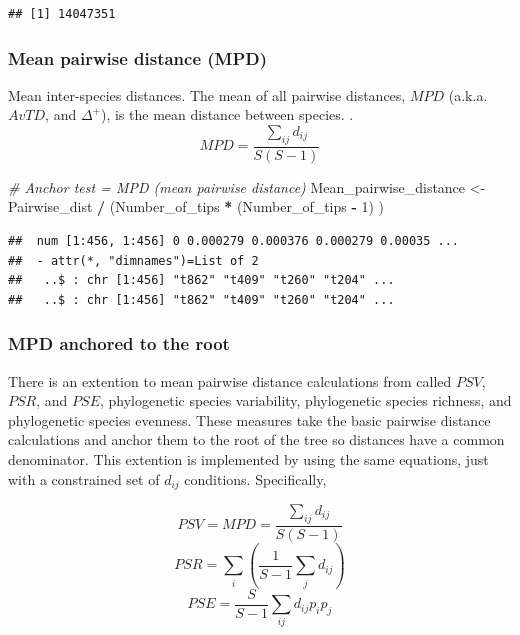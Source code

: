 \documentclass[]{book}
\newenvironment{Shaded}{\begin{snugshade}}{\end{snugshade}}
\newcommand{\DecValTok}[1]{\textcolor[rgb]{0.00,0.00,0.81}{{#1}}}
\newcommand{\StringTok}[1]{\textcolor[rgb]{0.31,0.60,0.02}{{#1}}}
\newcommand{\CommentTok}[1]{\textcolor[rgb]{0.56,0.35,0.01}{\textit{{#1}}}}
\newcommand{\OperatorTok}[1]{\textcolor[rgb]{0.81,0.36,0.00}{\textbf{{#1}}}}
\newcommand{\NormalTok}[1]{{#1}}
\theoremstyle{definition}
\theoremstyle{definition}
\theoremstyle{definition}
\theoremstyle{remark}
\begin{document}
\begin{verbatim}
## [1] 14047351
\end{verbatim}

\subsubsection{Mean pairwise distance
(MPD)}\label{mean-pairwise-distance-mpd}

Mean inter-species distances. The mean of all pairwise distances,
\(MPD\) (a.k.a. \(AvTD\), and \(\Delta^{+}\)), is the mean distance
between species. \citep{Clarke1998, Webb2002, Webb2008, Kembel2010}.
\[MPD = \dfrac{\sum_{ij} d_{ij}}{S(S-1)}\]

\begin{Shaded}
\begin{Highlighting}[]
\CommentTok{# Anchor test = MPD (mean pairwise distance)}
\NormalTok{Mean_pairwise_distance <-}\StringTok{ }
\StringTok{  }\NormalTok{Pairwise_dist }\OperatorTok{/}\StringTok{ }\NormalTok{(Number_of_tips }\OperatorTok{*}\StringTok{ }\NormalTok{(Number_of_tips }\OperatorTok{-}\StringTok{ }\DecValTok{1}\NormalTok{) ) }
\end{Highlighting}
\end{Shaded}

\begin{verbatim}
##  num [1:456, 1:456] 0 0.000279 0.000376 0.000279 0.00035 ...
##  - attr(*, "dimnames")=List of 2
##   ..$ : chr [1:456] "t862" "t409" "t260" "t204" ...
##   ..$ : chr [1:456] "t862" "t409" "t260" "t204" ...
\end{verbatim}

\subsubsection{MPD anchored to the root}\label{mpd-anchored-to-the-root}

There is an extention to mean pairwise distance calculations from
\citet{Helmus2010} called \(PSV\), \(PSR\), and \(PSE\), phylogenetic
species variability, phylogenetic species richness, and phylogenetic
species evenness. These measures take the basic pairwise distance
calculations and anchor them to the root of the tree so distances have a
common denominator. This extention is implemented by using the same
equations, just with a constrained set of \(d_{ij}\) conditions.
Specifically,

\[PSV = MPD = \dfrac{\sum_{ij} d_{ij}}{S(S-1)}\]
\[PSR = \sum_{i} {(\dfrac{1}{S-1} \sum_{j} {d_{ij}})}\]
\[PSE = \dfrac{S}{S-1} \sum_{ij} d_{ij}p_{i}p_{j}\]
\end{document}
